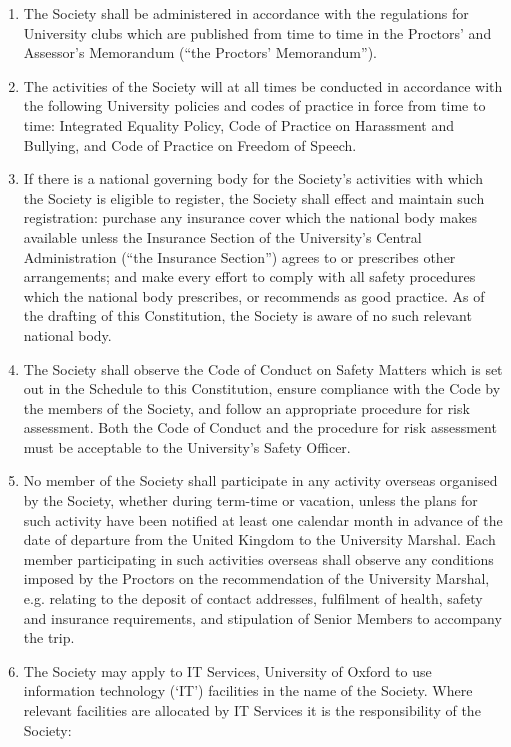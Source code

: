 \documentclass[11pt]{article}
\begin{document}
\begin{enumerate}
\item The Society shall be administered in accordance with the regulations for University clubs which are published from time to time in the Proctors' and Assessor's Memorandum (``the Proctors' Memorandum'').
\item The activities of the Society will at all times be conducted in accordance with the following University policies and codes of practice in force from time to time: Integrated Equality Policy, Code of Practice on Harassment and Bullying, and Code of Practice on Freedom of Speech.
\item \label{com:ins} If there is a national governing body for the Society's activities with which the Society is eligible to register, the Society shall effect and maintain such registration: purchase any insurance cover which the national body makes available unless the Insurance Section of the University's Central Administration (``the Insurance Section'') agrees to or prescribes other arrangements; and make every effort to comply with all safety procedures which the national body prescribes, or recommends as good practice.
\subitem As of the drafting of this Constitution, the Society is aware of no such relevant national body.
\item The Society shall observe the Code of Conduct on Safety Matters which is set out in the Schedule to this Constitution, ensure compliance with the Code by the members of the Society, and follow an appropriate procedure for risk assessment. Both the Code of Conduct and the procedure for risk assessment must be acceptable to the University's Safety Officer.
\item No member of the Society shall participate in any activity overseas organised by the Society, whether during term-time or vacation, unless the plans for such activity have been notified at least one calendar month in advance of the date of departure from the United Kingdom to the University Marshal. Each member participating in such activities overseas shall observe any conditions imposed by the Proctors on the recommendation of the University Marshal, e.g. relating to the deposit of contact addresses, fulfilment of health, safety and insurance requirements, and stipulation of Senior Members to accompany the trip.
\item  The Society may apply to IT Services, University of Oxford to use information technology (`IT') facilities in the name of the Society. Where relevant facilities are allocated by IT Services it is the responsibility of the Society:

\end{enumerate}
\end{document}
